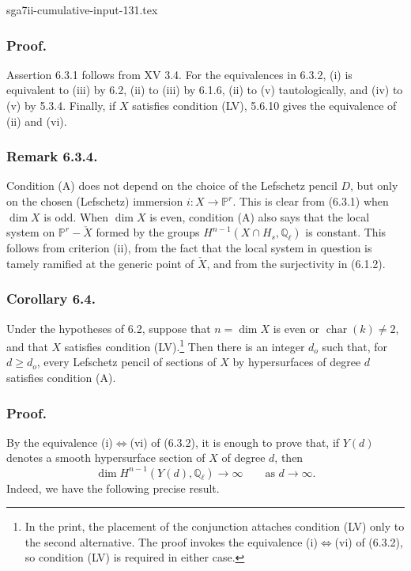 \begin{filecontents*}{sga7ii-cumulative-input-131.tex}
\subsubsection*{Proof.}
Assertion 6.3.1 follows from XV 3.4.  For the equivalences in 6.3.2,
(i) is equivalent to (iii) by 6.2, (ii) to (iii) by 6.1.6, (ii) to (v)
tautologically, and (iv) to (v) by 5.3.4.  Finally, if $X$ satisfies
condition (LV), 5.6.10 gives the equivalence of (ii) and (vi).

\subsubsection*{Remark 6.3.4.}
Condition (A) does not depend on the choice of the Lefschetz pencil
$D$, but only on the chosen (Lefschetz) immersion
$i:X\longrightarrow\mathbb P^r$.  This is clear from (6.3.1) when
$\dim X$ is odd.  When $\dim X$ is even, condition (A) also says that
the local system on $\mathbb P^r-\check X$ formed by the groups
$H^{n-1}(X\cap H_s,\mathbb Q_\ell)$ is constant.  This follows from
criterion (ii), from the fact that the local system in question is
tamely ramified at the generic point of $\check X$, and from the
surjectivity in (6.1.2).

\subsubsection*{Corollary 6.4.}
Under the hypotheses of 6.2, suppose that
$n=\dim X$ is even or $\operatorname{char}(k)\ne2$, and that $X$
satisfies condition (LV).\footnote{In the print, the placement of the
conjunction attaches condition (LV) only to the second alternative.
The proof invokes the equivalence (i)$\Longleftrightarrow$(vi) of
(6.3.2), so condition (LV) is required in either case.}
Then there is an integer $d_o$ such that, for $d\ge d_o$, every
Lefschetz pencil of sections of $X$ by hypersurfaces of degree $d$
satisfies condition (A).

\subsubsection*{Proof.}
By the equivalence (i)$\Longleftrightarrow$(vi) of (6.3.2), it is
enough to prove that, if $Y(d)$ denotes a smooth hypersurface section of
$X$ of degree $d$, then
\begin{equation}\tag{6.4.1}
\dim H^{n-1}(Y(d),\mathbb Q_\ell)\longrightarrow\infty
\qquad\text{as }d\longrightarrow\infty.
\end{equation}
Indeed, we have the following precise result.


\end{filecontents*}
